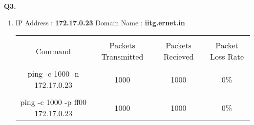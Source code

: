 \documentclass[12pt]{report}
\begin{document}
	\vspace*{10px}
	\large{\textbf{Q3.}}
	\linebreak[1]
	\normalsize{}
	
	\begin{enumerate}[label=\textbf{(\alph*)}]
		\item IP Address : \textbf{172.17.0.23} \hspace{10mm}  Domain Name : \textbf{iitg.ernet.in}\\[0.5pt]
		\begin{center}
		\begin{tabular}{| c | c | c | c |}
			\hline
			&&&\\[2pt]
			Command & Packets Transmitted & Packets Recieved & Packet Loss Rate\\[2pt]
			\hline
			&&&\\[2pt]
			ping -c 1000 -n 172.17.0.23 & 1000 & 1000 & 0\% \\[2pt]
			\hline
			&&&\\[2pt]
			ping -c 1000 -p ff00 172.17.0.23 & 1000 & 1000 & 0\% \\[2pt]
			\hline
			

\end{tabular}
\end{center}
\end{enumerate}
\end{document}

